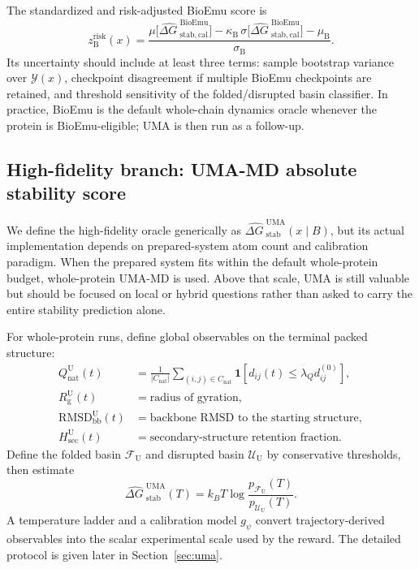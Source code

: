 \documentclass[11pt]{article}
\newcommand{\dG}{\ensuremath{\Delta G \ }}
\begin{document}
The standardized and risk-adjusted BioEmu score is
\begin{equation}
    z_{\mathrm B}^{\mathrm{risk}}(x)=\frac{\mu\big[\widehat{\dG}^{\mathrm{BioEmu}}_{\mathrm{stab,cal}}\big]-\kappa_{\mathrm B}\,\sigma\big[\widehat{\dG}^{\mathrm{BioEmu}}_{\mathrm{stab,cal}}\big]-\mu_{\mathrm B}}{\sigma_{\mathrm B}}.
\end{equation}
Its uncertainty should include at least three terms: sample bootstrap variance over $\mathcal{Y}(x)$, checkpoint disagreement if multiple BioEmu checkpoints are retained, and threshold sensitivity of the folded/disrupted basin classifier. In practice, BioEmu is the default whole-chain dynamics oracle whenever the protein is BioEmu-eligible; UMA is then run as a follow-up.


\subsection{High-fidelity branch: UMA-MD absolute stability score}

We define the high-fidelity oracle generically as $\widehat{\dG}^{\mathrm{UMA}}_{\mathrm{stab}}(x\mid B)$, but its actual implementation depends on prepared-system atom count and calibration paradigm. When the prepared system fits within the default whole-protein budget, whole-protein UMA-MD is used. Above that scale, UMA is still valuable but should be focused on local or hybrid questions rather than asked to carry the entire stability prediction alone.

For whole-protein runs, define global observables on the terminal packed structure:
\begin{align}
    Q_{\mathrm{nat}}^{\mathrm U}(t) &= \frac{1}{|C_{\mathrm{nat}}|}\sum_{(i,j)\in C_{\mathrm{nat}}}\mathbf{1}\!\left[d_{ij}(t)\leq \lambda_Q d_{ij}^{(0)}\right],\\
    R_{\mathrm g}^{\mathrm U}(t) &= \text{radius of gyration},\\
    \mathrm{RMSD}_{\mathrm{bb}}^{\mathrm U}(t) &= \text{backbone RMSD to the starting structure},\\
    H_{\mathrm{sec}}^{\mathrm U}(t) &= \text{secondary-structure retention fraction}.
\end{align}
Define the folded basin $\mathcal{F}_{\mathrm U}$ and disrupted basin $\mathcal{U}_{\mathrm U}$ by conservative thresholds, then estimate
\begin{equation}
\label{eq:twostategreward}
    \widehat{\dG}^{\mathrm{UMA}}_{\mathrm{stab}}(T)=k_B T \log\frac{p_{\mathcal{F}_{\mathrm U}}(T)}{p_{\mathcal{U}_{\mathrm U}}(T)}.
\end{equation}
A temperature ladder and a calibration model $g_\psi$ convert trajectory-derived observables into the scalar experimental scale used by the reward. The detailed protocol is given later in Section~\ref{sec:uma}.
\end{document}
